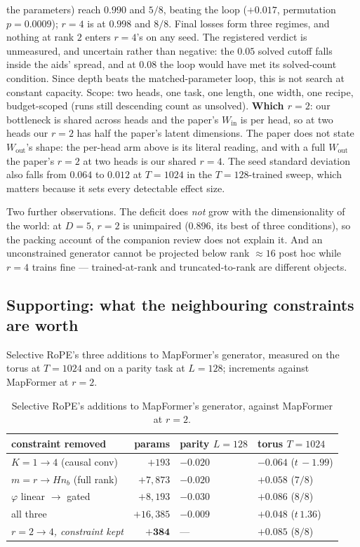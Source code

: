 \documentclass[11pt]{article}
\newcommand{\nb}{n_b}
\begin{document}
the parameters) reach $0.990$ and $5/8$, beating the loop ($+0.017$, permutation $p=0.0009$);
$r=4$ is at $0.998$ and $8/8$. Final losses form three regimes, and nothing at rank $2$ enters
$r=4$'s on any seed. The registered verdict is unmeasured, and uncertain rather than negative:
the $0.05$ solved cutoff falls inside the aids' spread, and at $0.08$ the loop would have met
its solved-count condition. Since depth beats the matched-parameter loop, this is not search
at constant capacity. Scope: two heads, one task, one length, one width, one recipe, budget-scoped (runs
still descending count as unsolved). \textbf{Which $r=2$}: our bottleneck is shared
across heads and the paper's $W_{\mathrm{in}}$ is per head, so at two heads our $r=2$
has half the paper's latent dimensions. The paper does not state $W_{\mathrm{out}}$'s
shape: the per-head arm above is its literal reading, and with a full
$W_{\mathrm{out}}$ the paper's $r=2$ at two heads is our shared $r=4$. The seed standard deviation also falls from $0.064$ to
$0.012$ at $T=1024$ in the $T=128$-trained sweep, which matters because it sets every
detectable effect size.

Two further observations. The deficit does \emph{not} grow with the dimensionality of
the world: at $D=5$, $r=2$ is unimpaired ($0.896$, its best of three conditions), so
the packing account of the companion review does not explain it. And an unconstrained
generator cannot be projected below rank $\approx16$ post hoc while $r=4$ trains fine
--- trained-at-rank and truncated-to-rank are different objects.

\subsection{Supporting: what the neighbouring constraints are worth}
\label{sec:knobs}

Selective RoPE's three additions to MapFormer's generator, measured on the torus at
$T=1024$ and on a parity task at $L=128$; increments against MapFormer at $r=2$.

\begin{table}[htbp]\centering\small
\caption{Selective RoPE's additions to MapFormer's generator, against MapFormer at $r=2$.}
\label{tab:knobs}
\begin{tabular}{lrll}
\toprule
constraint removed & params & parity $L{=}128$ & torus $T{=}1024$ \\
\midrule
$K=1 \to 4$ (causal conv)      & $+193$     & $-0.020$ & $-0.064$ ($t\,{-}1.99$) \\
$m = r \to H\nb$ (full rank)   & $+7{,}873$ & $-0.020$ & $+0.058$ ($7/8$) \\
$\varphi$ linear $\to$ gated   & $+8{,}193$ & $-0.030$ & $+0.086$ ($8/8$) \\
all three                      & $+16{,}385$& $-0.009$ & $+0.048$ ($t\,1.36$) \\
\midrule
\emph{$r=2\to4$, constraint kept} & $\mathbf{+384}$ & --- & $\mathbf{+0.085}$ ($8/8$) \\
\bottomrule
\end{tabular}
\end{table}
\end{document}
